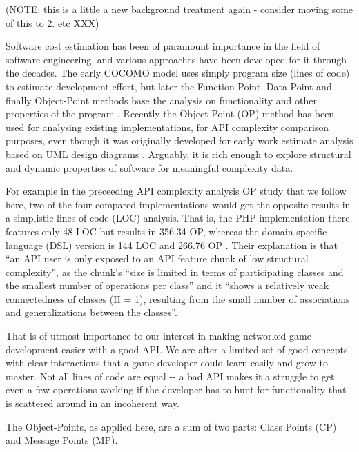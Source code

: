 \documentclass[conference]{IEEEtran}
\begin{document}
(NOTE: this is a little a new background treatment again - consider
moving some of this to 2. etc XXX)

Software cost estimation has been of paramount importance in the field
of software engineering, and various approaches have been developed
for it through the decades. The early COCOMO model uses simply program
size (lines of code) to estimate development effort, but later the
Function-Point, Data-Point and finally Object-Point methods base the
analysis on functionality and other properties of the program
\cite{henrich97repositorybased}. Recently the Object-Point (OP) method has been
used for analysing existing implementations, for API complexity
comparison purposes, even though it was originally developed for early
work estimate analysis based on UML design diagrams
\cite{api-complexity-analysis}. Arguably, it is rich enough to explore
structural and dynamic properties of software for meaningful
complexity data.

For example in the preceeding API complexity analysis OP study that we
follow here, two of the four compared implementations would get the
opposite results in a simplistic lines of code (LOC) analysis. That
is, the PHP implementation there features only 48 LOC but results in
356.34 OP, whereas the domain specific language (DSL) version is 144
LOC and 266.76 OP \cite{api-complexity-analysis}. Their explanation is
that ``an API user is only exposed to an API feature chunk of low
structural complexity'', as the chunk's ``size is limited in terms of
participating classes and the smallest number of operations per class''
and it ``shows a relatively weak connectedness of classes (H = 1),
resulting from the small number of associations and generalizations
between the classes''.

That is of utmost importance to our interest in making networked game
development easier with a good API. We are after a limited set of good
concepts with clear interactions that a game developer could learn
easily and grow to master. Not all lines of code are equal -{}- a bad
API makes it a struggle to get even a few operations working if the
developer has to hunt for functionality that is scattered around in an
incoherent way.

The Object-Points, as applied here, are a sum of two parts: Class
Points (CP) and Message Points (MP).

\end{document}
